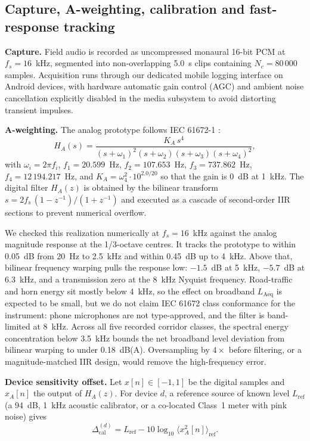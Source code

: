 \documentclass[conference]{IEEEtran}
\begin{document}
\subsection{Capture, A-weighting, calibration and fast-response tracking}

\textbf{Capture.} Field audio is recorded as uncompressed monaural 16-bit PCM at $f_s = 16$~kHz, segmented into non-overlapping 5.0~s clips containing $N_c = 80\,000$ samples. Acquisition runs through our dedicated mobile logging interface on Android devices, with hardware automatic gain control (AGC) and ambient noise cancellation explicitly disabled in the media subsystem to avoid distorting transient impulses.

\textbf{A-weighting.} The analog prototype follows IEC 61672-1 \cite{iec61672}:
\begin{equation}
H_A(s)=\frac{K_A\,s^{4}}{(s+\omega_1)^2(s+\omega_2)(s+\omega_3)(s+\omega_4)^2},
\label{eq:aw}
\end{equation}
with $\omega_i = 2\pi f_i$, $f_1 = 20.599$~Hz, $f_2 = 107.653$~Hz, $f_3 = 737.862$~Hz, $f_4 = 12\,194.217$~Hz, and $K_A=\omega_4^{2}\cdot10^{2.0/20}$ so that the gain is 0~dB at 1~kHz. The digital filter $H_A(z)$ is obtained by the bilinear transform $s = 2f_s\,(1-z^{-1})/(1+z^{-1})$ and executed as a cascade of second-order IIR sections to prevent numerical overflow.

We checked this realization numerically at $f_s = 16$~kHz against the analog magnitude response at the 1/3-octave centres. It tracks the prototype to within 0.05~dB from 20~Hz to 2.5~kHz and within 0.45~dB up to 4~kHz. Above that, bilinear frequency warping pulls the response low: $-1.5$~dB at 5~kHz, $-5.7$~dB at 6.3~kHz, and a transmission zero at the 8~kHz Nyquist frequency. Road-traffic and horn energy sit mostly below 4~kHz, so the effect on broadband $L_{\text{Aeq}}$ is expected to be small, but we do not claim IEC 61672 class conformance for the instrument: phone microphones are not type-approved, and the filter is band-limited at 8~kHz. Across all five recorded corridor classes, the spectral energy concentration below 3.5~kHz bounds the net broadband level deviation from bilinear warping to under 0.18~dB(A). Oversampling by $4\times$ before filtering, or a magnitude-matched IIR design, would remove the high-frequency error.

\textbf{Device sensitivity offset.} Let $x[n]\in[-1,1]$ be the digital samples and $x_A[n]$ the output of $H_A(z)$. For device $d$, a reference source of known level $L_{\text{ref}}$ (a 94~dB, 1~kHz acoustic calibrator, or a co-located Class~1 meter with pink noise) gives
\begin{equation}
\Delta_{\text{cal}}^{(d)} = L_{\text{ref}} - 10\log_{10}\!\Big\langle x_A^{2}[n]\Big\rangle_{\text{ref}}.
\label{eq:cal}
\end{equation}
\end{document}
